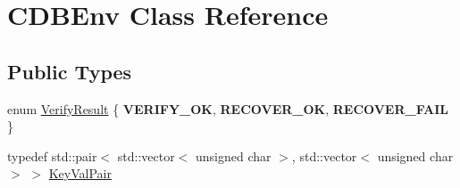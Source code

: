 \hypertarget{class_c_d_b_env}{}\section{C\+D\+B\+Env Class Reference}
\label{class_c_d_b_env}
\subsection*{Public Types}
\begin{DoxyCompactItemize}
\item 
enum \mbox{\hyperlink{class_c_d_b_env_a6fbf26da5d7f8f64a77a3ba15e4df244}{Verify\+Result}} \{ {\bfseries V\+E\+R\+I\+F\+Y\+\_\+\+OK}, 
{\bfseries R\+E\+C\+O\+V\+E\+R\+\_\+\+OK}, 
{\bfseries R\+E\+C\+O\+V\+E\+R\+\_\+\+F\+A\+IL}
 \}
\item 
typedef std\+::pair$<$ std\+::vector$<$ unsigned char $>$, std\+::vector$<$ unsigned char $>$ $>$ \mbox{\hyperlink{class_c_d_b_env_a53fd285f09c312973caa6f90b33937f5}{Key\+Val\+Pair}}
\end{DoxyCompactItemize}
